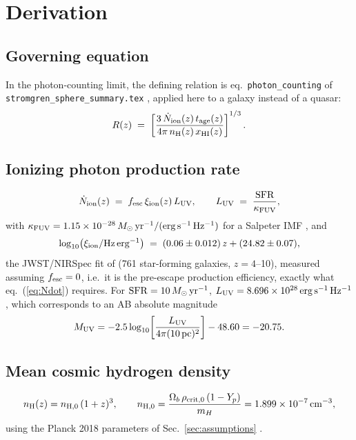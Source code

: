 \documentclass[11pt,a4paper]{article}
\newcommand{\Ndot}{\dot{N}_{\rm ion}}
\newcommand{\nH}{n_{\rm H}}
\newcommand{\Msun}{\,M_\odot}
\begin{document}
\section{Derivation}
\label{sec:derivation}

\subsection{Governing equation}
In the photon-counting limit, the defining relation is eq.~\texttt{photon\_counting} of
\texttt{stromgren\_sphere\_summary.tex} \citep{Cen2000}, applied here to a galaxy instead of a quasar:
\begin{equation}
  R(z) \;=\; \left[\frac{3\,\Ndot(z)\,t_{\rm age}(z)}{4\pi\,\nH(z)\,x_{\rm HI}(z)}\right]^{1/3}.
  \label{eq:R}
\end{equation}

\subsection{Ionizing photon production rate}
\begin{equation}
  \Ndot(z) \;=\; f_{\rm esc}\,\xi_{\rm ion}(z)\,L_{\rm UV}, \qquad
  L_{\rm UV} \;=\; \frac{\mathrm{SFR}}{\kappa_{\rm FUV}},
  \label{eq:Ndot}
\end{equation}
with $\kappa_{\rm FUV}=1.15\times10^{-28}\Msun\,{\rm yr^{-1}}/({\rm erg\,s^{-1}\,Hz^{-1}})$ for a Salpeter
IMF \citep{MadauDickinson2014}, and
\begin{equation}
  \log_{10}\!\left(\xi_{\rm ion}/{\rm Hz\,erg^{-1}}\right) \;=\; (0.06\pm0.012)\,z + (24.82\pm0.07),
  \label{eq:xiion}
\end{equation}
the JWST/NIRSpec fit of \citet{Llerena2024} (761 star-forming galaxies, $z=4$--10), measured assuming
$f_{\rm esc}=0$, i.e.\ it is the pre-escape production efficiency, exactly what eq.~(\ref{eq:Ndot}) requires.
For $\mathrm{SFR}=10\Msun\,{\rm yr^{-1}}$, $L_{\rm UV}=8.696\times10^{28}\,{\rm erg\,s^{-1}\,Hz^{-1}}$, which
corresponds to an AB absolute magnitude
\begin{equation}
  M_{\rm UV} = -2.5\log_{10}\!\left[\frac{L_{\rm UV}}{4\pi(10\,{\rm pc})^2}\right]-48.60 = -20.75.
  \label{eq:MUV}
\end{equation}

\subsection{Mean cosmic hydrogen density}
\begin{equation}
  \nH(z) = n_{{\rm H},0}\,(1+z)^3, \qquad
  n_{{\rm H},0} = \frac{\Omega_b\,\rho_{{\rm crit},0}\,(1-Y_p)}{m_H} = 1.899\times10^{-7}\,{\rm cm^{-3}},
  \label{eq:nH}
\end{equation}
using the Planck 2018 parameters of Sec.~\ref{sec:assumptions} \citep{Planck2018VI}.
\end{document}
